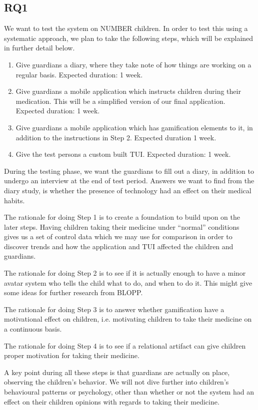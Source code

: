 \subsection{RQ1}
\label{sec:RQ2-methodology}
We want to test the system on NUMBER children. In order to test this using a systematic approach, we plan to take the following steps, which will be explained in further detail below. 
\begin{enumerate}
  \item Give guardians a diary, where they take note of how things are working on a regular basis. Expected duration: 1 week.
  \item Give guardians a mobile application which instructs children during their medication. This will be a simplified version of our final application. Expected duration: 1 week. 
  \item Give guardians a mobile application which has gamification elements to it, in addition to the instructions in Step 2. Expected duration 1 week.   
  \item Give the test persons a custom built TUI. Expected duration: 1 week. 
\end{enumerate}
During the testing phase, we want the guardians to fill out a diary, in addition to undergo an interview at the end of test period. Answers we want to find from the diary study, is whether the presence of technology had an effect on their medical habits. 

The rationale for doing Step 1 is to create a foundation to build upon on the later steps. Having children taking their medicine under ``normal'' conditions gives us a set of control data which we may use for comparison in order to discover trends and how the application and TUI affected the children and guardians. 

The rationale for doing Step 2 is to see if it is actually enough to have a minor avatar system who tells the child what to do, and when to do it. This might give some ideas for further research from BLOPP. 


The rationale for doing Step 3 is to answer whether gamification have a motivational effect on children, i.e. motivating children to take their medicine on a continuous basis. 

The rationale for doing Step 4 is to see if a relational artifact can give children proper motivation for taking their medicine.

A key point during all these steps is that guardians are actually on place, observing the children's behavior. We will not dive further into children's behavioural patterns or psychology, other than whether or not the system had an effect on their children opinions with regards to taking their medicine.       
 

